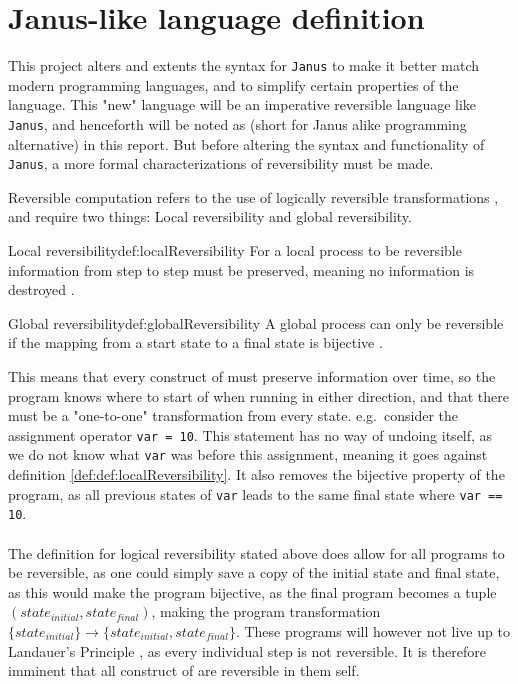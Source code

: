 \section{Janus-like language definition} \label{sec:language-def}
This project alters and extents the syntax for \texttt{Janus} to make it better match modern
programming languages, and to simplify certain properties of the language.
This "new" language will be an imperative reversible language like
\texttt{Janus}, and henceforth will be noted as \lan
(short for Janus alike programming alternative) in this report.
But before altering the syntax and functionality of \texttt{Janus}, a more formal characterizations
of reversibility must be made.

Reversible computation refers to the use of logically reversible transformations \cite{ARTICLE:2},
and require two things: Local reversibility and global reversibility.

\begin{myDefinition}{Local reversibility}{def:localReversibility}
For a local process to be reversible information from step to step must be preserved, meaning no
information is destroyed \cite{ARTICLE:1}.
\end{myDefinition}

\begin{myDefinition}{Global reversibility}{def:globalReversibility}
A global process can only be reversible if the mapping from a start state to a final state is
bijective \cite{ARTICLE:1}. 
\end{myDefinition}
\noindent
This means that every construct of \lan must preserve information over time, so the program
knows where to start of when running in either direction, and that there must be a "one-to-one"
transformation from every state. e.g.\ consider the assignment operator \texttt{var = 10}. This
statement has no way of undoing itself, as we do not know what \texttt{var} was before this
assignment, meaning it goes against definition \ref{def:def:localReversibility}. It also removes
the bijective property of the program, as all previous states of \texttt{var} leads to the same
final state where \texttt{var == 10}.
\\
\\
The definition for logical reversibility stated above does allow for all programs to be reversible,
as one could simply save a copy of the initial state and final state, as this would make
the program bijective, as the final program becomes a tuple $(state_{initial}, state_{final})$,
making the program transformation $\{state_{initial}\} \to \{state_{initial}, state_{final}\}$.
These programs will however not live up to Landauer's Principle \cite{article:3}, as every
individual step is not reversible. It is therefore imminent that all construct of \lan are
reversible in them self.

